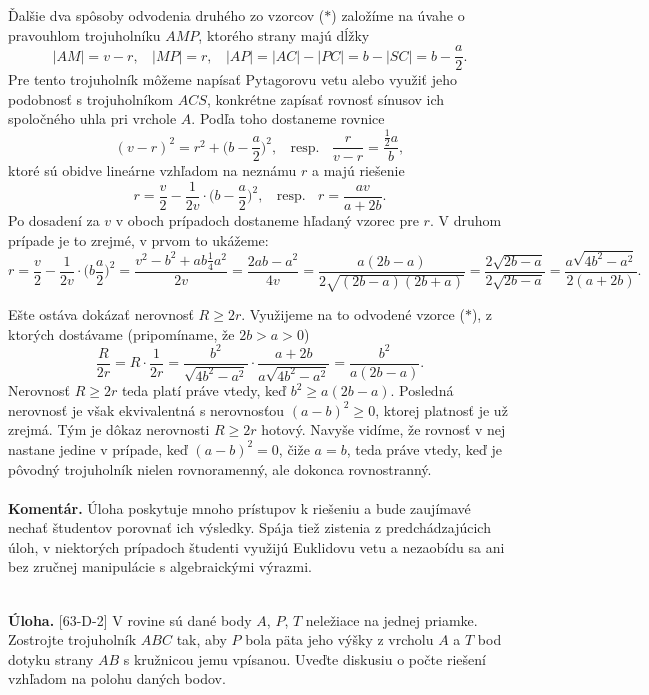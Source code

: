 \documentclass[11pt,a4paper,oneside,final]{book}
\newcommand{\kom}{\textbf{Komentár.} }
\newcommand{\ul}{\textbf{Úloha.} }
\begin{document}
Ďalšie dva spôsoby odvodenia druhého zo vzorcov ($\ast$) založíme na úvahe o pravouhlom trojuholníku $AMP$, ktorého strany majú dĺžky
$$|AM| = v -r, \ \ \ \ |MP| = r, \ \ \ \ |AP| = |AC| - |PC| = b - |SC| = b - \frac{a}{2}.$$
Pre tento trojuholník môžeme napísať Pytagorovu vetu alebo využiť jeho podobnosť s trojuholníkom $ACS$, konkrétne zapísať rovnosť sínusov ich spoločného uhla pri vrchole $A$. Podľa toho dostaneme rovnice
$$(v - r)^2= r^2+\big(b -\frac{a}{2}\big)^2, \ \ \ \ \text{resp.} \ \ \ \ \frac{r}{v-r}=  \frac{\frac{1}{2}a}{b},$$
ktoré sú obidve lineárne vzhľadom na neznámu $r$ a majú riešenie
$$r = \frac{v}{2}-\frac{1}{2v}\cdot \big( b - \frac{a}{2} \big)^2, \ \ \ \ \text{resp.}\ \ \ \  r=
\frac{av}{a+2b}.$$
Po dosadení za $v$ v oboch prípadoch dostaneme hľadaný vzorec pre $r$. V druhom prípade
je to zrejmé, v prvom to ukážeme:
$$r =\frac{v}{2}  - \frac{1}{2v} \cdot \big(b \frac{a}{2}\big)^2= \frac{v^2 - b^2 + ab \frac{1}{4}a^2}{2v}=\frac{2ab - a^2}{4v}=\frac{a(2b - a)}{2\sqrt{(2b -a)(2b + a)}}=\frac{2\sqrt{2b-a}}{2\sqrt{2b-a}}=\frac{a \sqrt{4b^2 -a^2}}{2(a + 2b)}.$$

Ešte ostáva dokázať nerovnosť $R \geq 2r$. Využijeme na to odvodené vzorce ($\ast$), z ktorých dostávame (pripomíname, že $2b > a > 0$)
$$ \frac{R}{2r}= R \cdot \frac{1}{2r}=\frac{b^2}{\sqrt{4b^2-a^2}}\cdot \frac{a+2b}{a \sqrt{4b^2-a^2}}=\frac{b^2}{a(2b-a)}.$$
Nerovnosť $R \geq 2r$ teda platí práve vtedy, keď $b^2\geq a(2b -a)$. Posledná nerovnosť je však ekvivalentná s nerovnosťou $(a - b)^2\geq 0$, ktorej platnosť je už zrejmá. Tým je dôkaz nerovnosti $R \geq 2r$ hotový. Navyše vidíme, že rovnosť v nej nastane jedine v prípade, keď $(a - b)^2 = 0$, čiže $a = b$, teda práve vtedy, keď je pôvodný trojuholník nielen rovnoramenný, ale dokonca rovnostranný.\\
\\
\kom Úloha poskytuje mnoho prístupov k riešeniu a bude zaujímavé nechať študentov porovnať ich výsledky. Spája tiež zistenia z predchádzajúcich úloh, v niektorých prípadoch študenti využijú Euklidovu vetu a nezaobídu sa ani bez zručnej manipulácie s algebraickými výrazmi. \\
\\
\begin{tcolorbox}[breakable,notitle,boxrule=0pt,colback=light-gray,colframe=light-gray]\ul [63-D-2]  V rovine sú dané body $A$, $P$, $T$ neležiace na jednej priamke. Zostrojte trojuholník $ABC$ tak, aby $P$ bola päta jeho výšky z vrcholu $A$ a $T$ bod dotyku strany $AB$ s kružnicou jemu vpísanou. Uveďte diskusiu o počte riešení vzhľadom na polohu daných bodov.

\end{tcolorbox}
\end{document}
